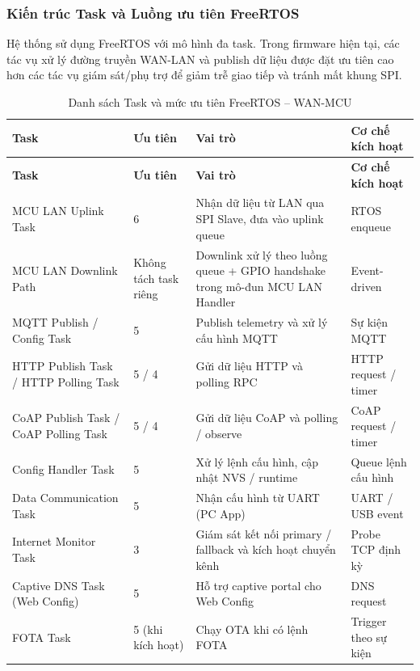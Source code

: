         \subsubsection{Kiến trúc Task và Luồng ưu tiên FreeRTOS}
        
            Hệ thống sử dụng FreeRTOS với mô hình đa task. Trong firmware hiện tại, các tác vụ xử lý đường truyền WAN-LAN và publish dữ liệu được đặt ưu tiên cao hơn các tác vụ giám sát/phụ trợ để giảm trễ giao tiếp và tránh mất khung SPI.
            
            \begin{longtable}{|p{}|p{}|p{}|p{}|}
                \caption{Danh sách Task và mức ưu tiên FreeRTOS -- WAN-MCU}
                \label{tab:freertos_wan} \\
                \hline
                \textbf{Task} & \textbf{Ưu tiên} & \textbf{Vai trò} & \textbf{Cơ chế kích hoạt} \\ \hline
                \endfirsthead
                \hline
                \textbf{Task} & \textbf{Ưu tiên} & \textbf{Vai trò} & \textbf{Cơ chế kích hoạt} \\ \hline
                \endhead
                MCU LAN Uplink Task & 6 & Nhận dữ liệu từ LAN qua SPI Slave, đưa vào uplink queue & RTOS enqueue \\ \hline
                MCU LAN Downlink Path & Không tách task riêng & Downlink xử lý theo luồng queue + GPIO handshake trong mô-đun MCU LAN Handler & Event-driven \\ \hline
                MQTT Publish / Config Task & 5 & Publish telemetry và xử lý cấu hình MQTT & Sự kiện MQTT \\ \hline
                HTTP Publish Task / HTTP Polling Task & 5 / 4 & Gửi dữ liệu HTTP và polling RPC & HTTP request / timer \\ \hline
                CoAP Publish Task / CoAP Polling Task & 5 / 4 & Gửi dữ liệu CoAP và polling / observe & CoAP request / timer \\ \hline
                Config Handler Task & 5 & Xử lý lệnh cấu hình, cập nhật NVS / runtime & Queue lệnh cấu hình \\ \hline
                Data Communication Task & 5 & Nhận cấu hình từ UART (PC App) & UART / USB event \\ \hline
                Internet Monitor Task & 3 & Giám sát kết nối primary / fallback và kích hoạt chuyển kênh & Probe TCP định kỳ \\ \hline
                Captive DNS Task (Web Config) & 5 & Hỗ trợ captive portal cho Web Config & DNS request \\ \hline
                FOTA Task & 5 (khi kích hoạt) & Chạy OTA khi có lệnh FOTA & Trigger theo sự kiện \\ \hline
                \end{longtable}
                
